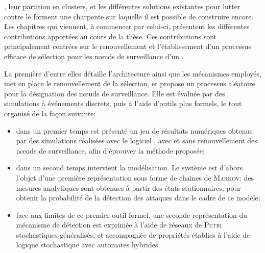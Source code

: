 \vfil
{}, leur partition en clusters, et les différentes solutions existantes pour lutter contre le \dds forment une charpente sur laquelle il est possible de construire encore.
Les chapitres qui viennent, à commencer par celui-ci, présentent les différentes contributions apportées au cours de la thèse.
Ces contributions sont principalement centrées sur le renouvellement et l'établissement d'un processus efficace de sélection pour les nœuds de surveillance d'un \rcs.

La première d'entre elles détaille l'architecture ainsi que les mécanismes employés, met en place le renouvellement de la sélection, et propose un processus aléatoire pour la désignation des nœuds de surveillance.
Elle est évaluée par des simulations à événements discrets, puis à l'aide d'outils plus formels, le tout organisé de la façon suivante:
\begin{itemize}
    \item dans un premier temps est présenté un jeu de résultats numériques obtenus par des simulations réalisées avec le logiciel \nsii, avec et sans renouvellement des nœuds de surveillance, afin d'éprouver la méthode proposée;
    \item dans un second temps intervient la modélisation. Le système est d'abors l'objet d'une première représentation sous forme de chaines de \textsc{Markov}: des mesures analytiques sont obtenues à partir des états stationnaires, pour obtenir la probabilité de la détection des attaques dans le cadre de ce modèle;
    \item face aux limites de ce premier outil formel, une seconde représentation du mécanisme de détection est exprimée à l'aide de réseaux de \textsc{Petri} stochastiques généralisés, et accompagnée de propriétés établies à l'aide de logique stochastique avec automates hybrides.
\end{itemize}
\vfil

